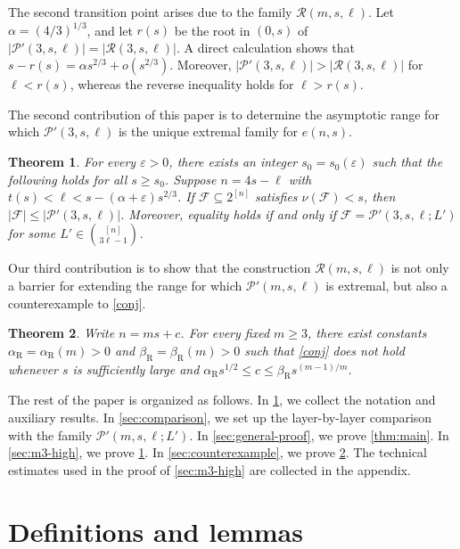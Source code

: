 \documentclass[10pt,a4paper]{article}
\numberwithin{equation}{section}
\newtheorem{theorem}{Theorem}[section]
\theoremstyle{definition}
\newcommand{\F}{\mathcal F}
\begin{document}
The second transition point arises due to the family $\mathcal R(m,s,\ell)$.
Let $\alpha=(4/3)^{1/3}$, and let $r(s)$ be the root in $(0,s)$ of $|\mathcal P'(3,s,\ell)|=|\mathcal R(3,s,\ell)|$.
A direct calculation shows that $s-r(s)=\alpha s^{2/3}+o(s^{2/3})$.
Moreover, $|\mathcal P'(3,s,\ell)|>|\mathcal R(3,s,\ell)|$ for $\ell<r(s)$, whereas the reverse inequality holds for $\ell>r(s)$.



The second contribution of this paper is to determine the asymptotic range for which $\mathcal P'(3,s,\ell)$ is the unique extremal family for $e(n,s)$.

\begin{theorem}\label{thm:m3-high-range}
        For every $\varepsilon>0$, there exists an integer $s_0=s_0(\varepsilon)$ such that the following holds for all $s\ge s_0$.
        Suppose $n=4s-\ell$ with $t(s)<\ell<s-(\alpha+\varepsilon)s^{2/3}$.
        If $\F\subseteq 2^{[n]}$ satisfies $\nu(\F)<s$, then $|\F|\le|\mathcal P'(3,s,\ell)|$.
        Moreover, equality holds if and only if $\F=\mathcal P'(3,s,\ell;L')$ for some $L'\in\binom{[n]}{3\ell-1}$.
\end{theorem}

Our third contribution is to show that the construction $\mathcal R(m,s,\ell)$ is not only a barrier for extending the range for which $\mathcal P'(m,s,\ell)$ is extremal, but also a counterexample to \cref{conj}.
\begin{theorem}\label{thm:conj}
        Write $n=ms+c$.
        For every fixed $m\ge3$, there exist constants $\alpha_{\mathrm R}=\alpha_{\mathrm R}(m)>0$ and $\beta_{\mathrm R}=\beta_{\mathrm R}(m)>0$ such that \cref{conj} does not hold whenever $s$ is sufficiently large and $\alpha_{\mathrm R}s^{1/2}\le c\le \beta_{\mathrm R}s^{(m-1)/m}$.
\end{theorem}

The rest of the paper is organized as follows.
In \cref{sec:tools}, we collect the notation and auxiliary results.
In \cref{sec:comparison}, we set up the layer-by-layer comparison with the family $\mathcal P'(m,s,\ell;L')$.
In \cref{sec:general-proof}, we prove \cref{thm:main}.
In \cref{sec:m3-high}, we prove \cref{thm:m3-high-range}.
In \cref{sec:counterexample}, we prove \cref{thm:conj}.
The technical estimates used in the proof of \cref{sec:m3-high} are collected in the appendix.


\section{Definitions and lemmas}\label{sec:tools}
\end{document}
